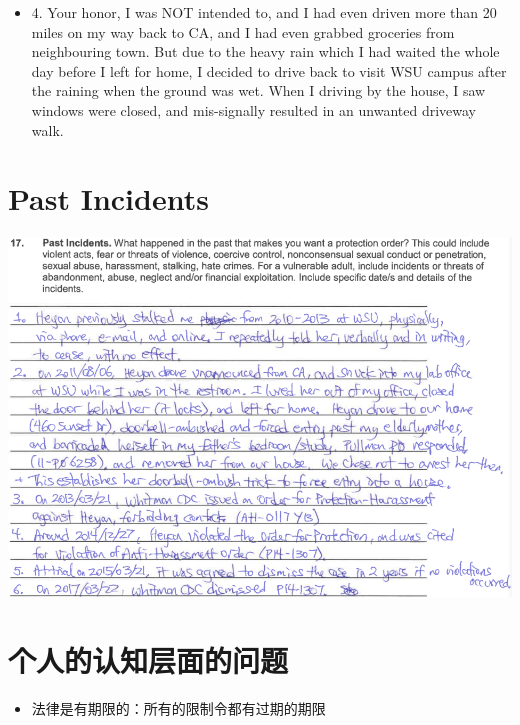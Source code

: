 \documentclass[9pt, b5paper]{article}
\begin{document}
\begin{itemize}
\item 4. Your honor, I was NOT intended to, and I had even driven more than 20 miles on my way back to CA, and I had even grabbed groceries from neighbouring town. But due to the heavy rain which I had waited the whole day before I left for home, I decided to drive back to visit WSU campus after the raining when the ground was wet. When I driving by the house, I saw windows were closed, and mis-signally resulted in an unwanted driveway walk.
\end{itemize}
\section{Past Incidents}
\label{sec-4}

\includegraphics[width=.9\linewidth]{./pic/dearCousin_20220919_183625.png}

\section{个人的认知层面的问题　　}
\label{sec-5}
\begin{itemize}
\item 法律是有期限的：所有的限制令都有过期的期限
\end{itemize}
\end{document}
